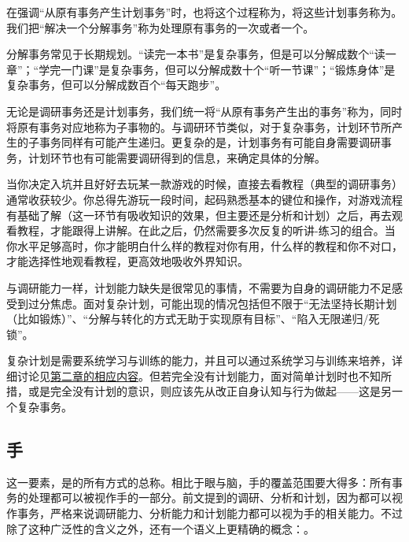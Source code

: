 在强调“从原有事务产生计划事务”时，也将这个过程称为，将这些计划事务称为。我们把“解决一个分解事务”称为处理原有事务的一次或者一个。
\begin{examples}
分解事务常见于长期规划。“读完一本书”是复杂事务，但是可以分解成数个“读一章”；“学完一门课”是复杂事务，但可以分解成数十个“听一节课”；“锻炼身体”是复杂事务，但可以分解成数百个“每天跑步”。
\end{examples}
无论是调研事务还是计划事务，我们统一将“从原有事务产生出的事务”称为，同时将原有事务对应地称为子事物的。与调研环节类似，对于复杂事务，计划环节所产生的子事务同样有可能产生递归。更复杂的是，计划事务有可能自身需要调研事务，计划环节也有可能需要调研得到的信息，来确定具体的分解。
\begin{examples}
当你决定入坑并且好好去玩某一款游戏的时候，直接去看教程（典型的调研事务）通常收获较少。你总得先游玩一段时间，起码熟悉基本的键位和操作，对游戏流程有基础了解（这一环节有吸收知识的效果，但主要还是分析和计划）之后，再去观看教程，才能跟得上讲解。在此之后，仍然需要多次反复的听讲-练习的组合。当你水平足够高时，你才能明白什么样的教程对你有用，什么样的教程和你不对口，才能选择性地观看教程，更高效地吸收外界知识。
\end{examples}
与调研能力一样，计划能力缺失是很常见的事情，不需要为自身的调研能力不足感受到过分焦虑。面对复杂计划，可能出现的情况包括但不限于“无法坚持长期计划（比如锻炼）”、“分解与转化的方式无助于实现原有目标”、“陷入无限递归/死锁”。

复杂计划是需要系统学习与训练的能力，并且可以通过系统学习与训练来培养，详细讨论见\hyperref[sec:方法与过程]{第二章的相应内容}。但若完全没有计划能力，面对简单计划时也不知所措，或是完全没有计划的意识，则应该先从改正自身认知与行为做起——这是另一个复杂事务。

\subsection{手}
这一要素，是的所有方式的总称。相比于眼与脑，手的覆盖范围要大得多：所有事务的处理都可以被视作手的一部分。前文提到的调研、分析和计划，因为都可以视作事务，严格来说调研能力、分析能力和计划能力都可以视为手的相关能力。不过除了这种广泛性的含义之外，还有一个语义上更精确的概念：。

